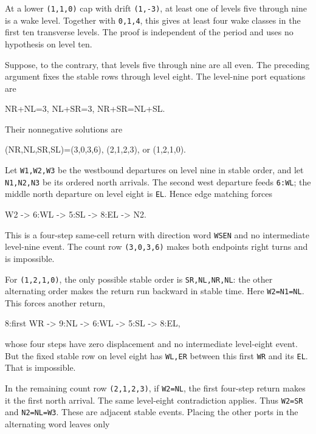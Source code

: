 \documentclass[11pt,letterpaper]{article}
\theoremstyle{plain}
\theoremstyle{definition}
\begin{document}
\begin{NoHyper}
At a lower \texttt{(1,1,0)} cap with drift \texttt{(1,-3)}, at least one of levels five through nine is a wake level. Together with \texttt{0,1,4}, this gives at least four wake classes in the first ten transverse levels. The proof is independent of the period and uses no hypothesis on level ten.

Suppose, to the contrary, that levels five through nine are all even. The preceding argument fixes the stable rows through level eight. The level-nine port equations are

\begin{codeblock}
NR+NL=3,       NL+SR=3,       NR+SR=NL+SL.
\end{codeblock}

Their nonnegative solutions are

\begin{codeblock}
(NR,NL,SR,SL)=(3,0,3,6), (2,1,2,3), or (1,2,1,0).
\end{codeblock}

Let \texttt{W1,W2,W3} be the westbound departures on level nine in stable order, and let \texttt{N1,N2,N3} be its ordered north arrivals. The second west departure feeds \texttt{6:WL}; the middle north departure on level eight is \texttt{EL}. Hence edge matching forces

\begin{codeblock}
W2 -> 6:WL -> 5:SL -> 8:EL -> N2.
\end{codeblock}

This is a four-step same-cell return with direction word \texttt{WSEN} and no intermediate level-nine event. The count row \texttt{(3,0,3,6)} makes both endpoints right turns and is impossible.

For \texttt{(1,2,1,0)}, the only possible stable order is \texttt{SR,NL,NR,NL}: the other alternating order makes the return run backward in stable time. Here \texttt{W2=N1=NL}. This forces another return,

\begin{codeblock}
8:first WR -> 9:NL -> 6:WL -> 5:SL -> 8:EL,
\end{codeblock}

whose four steps have zero displacement and no intermediate level-eight event. But the fixed stable row on level eight has \texttt{WL,ER} between this first \texttt{WR} and its \texttt{EL}. That is impossible.

In the remaining count row \texttt{(2,1,2,3)}, if \texttt{W2=NL}, the first four-step return makes it the first north arrival. The same level-eight contradiction applies. Thus \texttt{W2=SR} and \texttt{N2=NL=W3}. These are adjacent stable events. Placing the other ports in the alternating word leaves only


\end{NoHyper}
\end{document}
